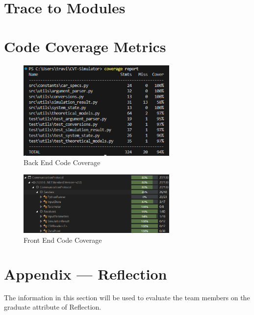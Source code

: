 \documentclass[12pt, titlepage]{article}
\begin{document}
\section{Trace to Modules}		

\section{Code Coverage Metrics}

\begin{figure}[H]
  \begin{center}
   \includegraphics[width=0.7\textwidth]{UnitTestCoverageReport.png}
  \caption{Back End Code Coverage}
  \label{Fig_Home} 
  \end{center}
\end{figure}

\begin{figure}[H]
  \begin{center}
   \includegraphics[width=0.7\textwidth]{CSUnitTestCoverage.png}
  \caption{Front End Code Coverage}
  \label{Fig_Home} 
  \end{center}
\end{figure}





\newpage{}
\section*{Appendix --- Reflection}

The information in this section will be used to evaluate the team members on the
graduate attribute of Reflection.
\end{document}
